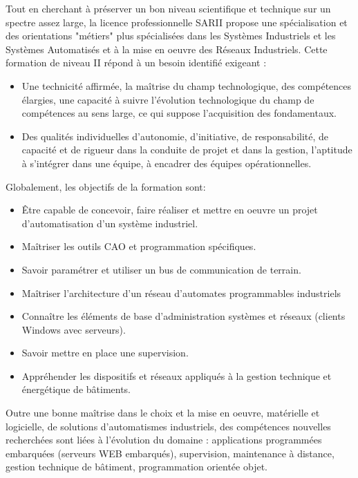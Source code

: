 \documentclass[11pt]{article}
\begin{document}
\begin{multicols}{2}
\raggedcolumns

Tout en cherchant à préserver un bon niveau scientifique et technique sur un spectre assez large, la licence professionnelle SARII propose une spécialisation et des orientations "métiers" plus spécialisées dans les Systèmes Industriels et les Systèmes Automatisés et à la mise en oeuvre des Réseaux Industriels. Cette formation de niveau II répond à un besoin identifié exigeant :\\
\begin{itemize}
\item Une technicité affirmée, la maîtrise du champ technologique, des compétences élargies, une capacité à suivre l'évolution technologique du champ de compétences au sens large, ce qui suppose l'acquisition des fondamentaux.
\item Des qualités individuelles d'autonomie, d'initiative, de responsabilité, de capacité et de rigueur dans la conduite de projet et dans la gestion, l'aptitude à s'intégrer dans une équipe, à encadrer des équipes opérationnelles.\\
\end{itemize}
Globalement, les objectifs de la formation sont:
\begin{itemize}
\item Être capable de concevoir, faire réaliser et mettre en oeuvre un projet d'automatisation d'un système industriel.
\item Maîtriser les outils CAO et programmation spécifiques.
\item Savoir paramétrer et utiliser un bus de communication de terrain.
\item Maîtriser l'architecture d'un réseau d'automates programmables industriels
\item Connaître les éléments de base d'administration systèmes et réseaux (clients Windows avec serveurs).
\item Savoir mettre en place une supervision.
\item Appréhender les dispositifs et réseaux appliqués à la gestion technique et énergétique de bâtiments.
\end{itemize}
Outre une bonne maîtrise dans le choix et la mise en oeuvre, matérielle et logicielle, de solutions d'automatismes industriels, des compétences nouvelles recherchées sont liées à l'évolution du domaine : applications programmées embarquées (serveurs WEB embarqués), supervision, maintenance à distance,  gestion technique de bâtiment, programmation orientée objet.


\end{multicols}
\end{document}
